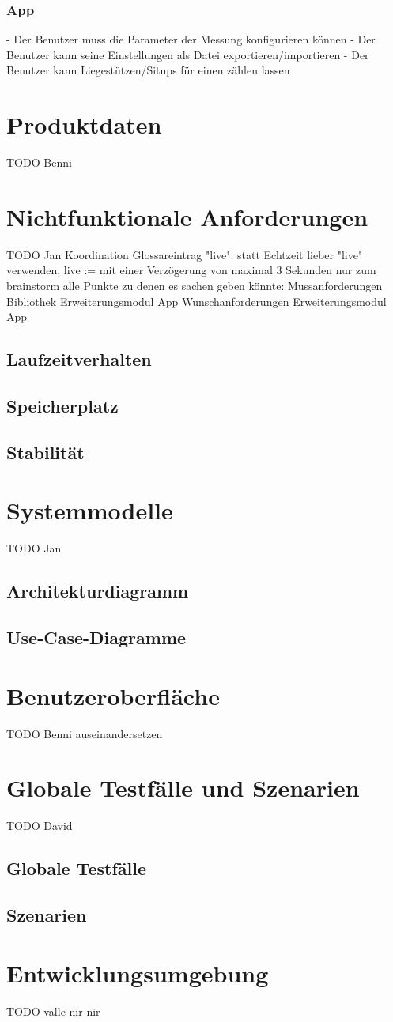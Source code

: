 \documentclass[a4paper,12pt]{article}
\begin{document}
    \subsubsection{App}

-	Der Benutzer muss die Parameter der Messung konfigurieren können
-	Der Benutzer kann seine Einstellungen als Datei exportieren/importieren
-	Der Benutzer kann Liegestützen/Situps für einen zählen lassen

\section{Produktdaten}
TODO Benni

\section{Nichtfunktionale Anforderungen}
TODO Jan Koordination
Glossareintrag "live": statt Echtzeit lieber "live" verwenden, live := mit einer Verzögerung von maximal 3 Sekunden
  nur zum brainstorm alle Punkte zu denen es sachen geben könnte:
  {Mussanforderungen}
      {Bibliothek}
      {Erweiterungsmodul}
      {App}
    {Wunschanforderungen}
      {Erweiterungsmodul}
      {App}

\subsection{Laufzeitverhalten}
\subsection{Speicherplatz}
\subsection{Stabilität}

\section{Systemmodelle}
TODO Jan
  \subsection{Architekturdiagramm}
  \subsection{Use-Case-Diagramme}
\section{Benutzeroberfläche}
TODO Benni auseinandersetzen
\section{Globale Testfälle und Szenarien}
TODO David
  \subsection{Globale Testfälle}
  \subsection{Szenarien}
\section{Entwicklungsumgebung}
TODO valle
\Gls{nir}
\gls{nir}
\clearpage

\end{document}

